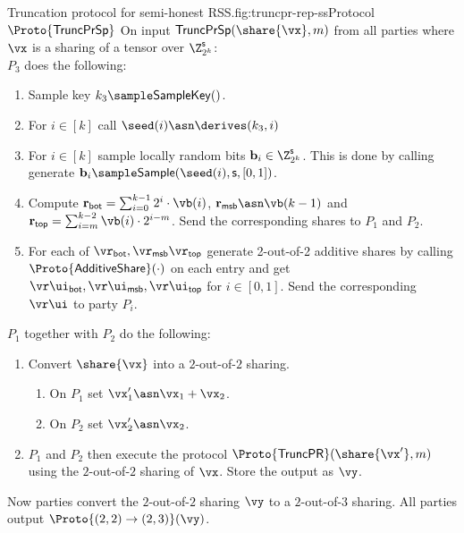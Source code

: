 \begin{Boxfig}{Truncation protocol for semi-honest
RSS.}{fig:truncpr-rep-ss}{Protocol $\Proto{\mathsf{TruncPrSp}}$}
On input
$\mathsf{TruncPrSp}(\share{\vx}, m)$ from all parties where $\vx$ is a sharing
of a tensor over $\Z_{2^k}^{\mathsf{s}}$: \\
$P_3$ does the following:
  \begin{enumerate}
    \item Sample key $k_3 \sample \mathsf{SampleKey}()$.
    \item For $i \in [k]$ call $\seed(i) \asn \derives(k_3, i)$
    \item For $i \in [k]$ sample locally random bits $\mathbf{b}_i \in \Z_{2^k}^{\mathsf{s}}$.
    This is done by calling
    generate $\mathbf{b}_i \sample \mathsf{Sample}(\seed(i), \mathsf{s}, [0,1])$.
    \item Compute
    $\mathbf{r}_{\mathsf{bot}} = \sum_{i=0}^{k-1}2^i \cdot \vb(i)$,
    $\mathbf{r}_{\mathsf{msb}} \asn \vb(k-1)$ and
    $\mathbf{r}_{\mathsf{top}} = \sum_{i=m}^{k-2} \vb(i) \cdot 2^{i-m}$. Send
    the corresponding shares to $P_1$ and $P_2$.
    \item For each of $\vr_{\mathsf{bot}}, \vr_{\mathsf{msb}} \vr_{\mathsf{top}}$
    generate 2-out-of-2 additive shares by calling $\Proto{\mathsf{AdditiveShare}}(\cdot)$
    on each entry and get $
    \vr\ui_{\mathsf{bot}}, \vr\ui_{\mathsf{msb}}, \vr\ui_{\mathsf{top}}$ for $i \in [0,1]$. Send the corresponding $\vr\ui$ to party $P_i$.
 \end{enumerate}
$P_1$ together with $P_2$ do the following:

\begin{enumerate}
   \item Convert $\share{\vx}$ into a $2$-out-of-$2$ sharing.
   \begin{enumerate}
      \item On $P_1$ set $\vx'_1 \asn \vx_1 + \vx_2$.
      \item On $P_2$ set $\vx'_2 \asn \vx_2$.
   \end{enumerate}

   \item $P_1$ and $P_2$ then execute the protocol $\Proto{\mathsf{TruncPR}}(\share{\vx'}, m)$
   using the $2$-out-of-$2$ sharing of $\vx$. Store the output as $\vy$.
\end{enumerate}

 Now parties convert the $2$-out-of-$2$ sharing $\vy$ to a $2$-out-of-$3$
 sharing. All parties output $\Proto{(2,2)\rightarrow(2,3)}(\vy)$.


\end{Boxfig}
